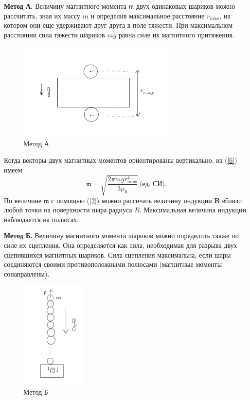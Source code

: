 \documentclass[a4paper, 12pt]{article}
\begin{document}
\textbf{Метод А.} Величину магнитного момента $\mathfrak{m}$ двух одинаковых шариков можно рассчитать, зная их массу $m$ и определив максимальное расстояние $r_{max}$, на котором они еще удерживают друг друга в поле тяжести. При максимальном расстоянии сила тяжести шариков $mg$ равна силе их магнитного притяжения.
\begin{figure}[h]
    \centering
    \includegraphics[width=0.7\textwidth]{path1}
    \caption{Метод А}
    \label{fig:path1}
\end{figure}
Когда векторы двух магнитных моментов ориентированы вертикально, из (\ref{6}) имеем
\begin{equation}
    \mathfrak{m} = \sqrt{\frac{2\pi mgr^4_{max}}{3 \mu_0}} \ \text{(ед. СИ).}
\end{equation}
По величине $\mathfrak{m}$ с помощью (\ref{2}) можно рассичать величину индукции $\textbf{B}$ вблизи любой точки на поверхности шара радиуса $R$. Максимальная величина индукции наблюдается на полюсах.

\textbf{Метод Б.} Величину магнитного момента шариков можно определить также по силе их сцепления. Она определяется как сила, необходимая для разрыва двух сцепившихся магнитных шариков. Сила сцепления максимальна, если шары соединяются своими противоположными полюсами (магнитные моменты сонаправлены).

\begin{figure}
	\begin{center}
		\includegraphics[width=0.3\textwidth]{path2}
		\caption{Метод Б}
	\end{center}
\end{figure}
\end{document}
